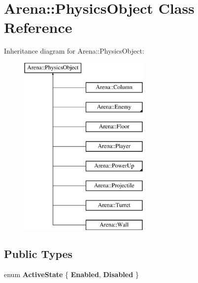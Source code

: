 \hypertarget{class_arena_1_1_physics_object}{\section{Arena\+:\+:Physics\+Object Class Reference}
\label{class_arena_1_1_physics_object}
}
Inheritance diagram for Arena\+:\+:Physics\+Object\+:\begin{figure}[H]
\begin{center}
\leavevmode
\includegraphics[height=9.000000cm]{class_arena_1_1_physics_object}
\end{center}
\end{figure}
\subsection*{Public Types}
\begin{DoxyCompactItemize}
\item 
\hypertarget{class_arena_1_1_physics_object_a892a743368b715227ee1a0fa27493899}{enum {\bfseries Active\+State} \{ {\bfseries Enabled}, 
{\bfseries Disabled}
 \}}\label{class_arena_1_1_physics_object_a892a743368b715227ee1a0fa27493899}

\end{DoxyCompactItemize}
